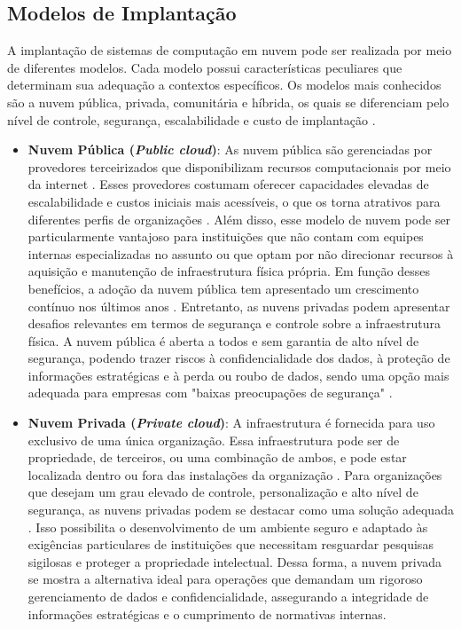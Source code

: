 \subsection{Modelos de Implantação}

A implantação de sistemas de computação em nuvem pode ser realizada por meio de diferentes modelos. Cada modelo possui características peculiares que determinam sua adequação a contextos específicos. Os modelos mais conhecidos são a nuvem pública, privada, comunitária e híbrida, os quais se diferenciam pelo nível de controle, segurança, escalabilidade e custo de implantação \cite{mell2011}.

\begin{itemize}
\item \textbf{Nuvem Pública (\textit{Public cloud})}: As nuvem pública são gerenciadas por provedores terceirizados que disponibilizam recursos computacionais por meio da internet \cite{carroll2011}. Esses provedores costumam oferecer capacidades elevadas de escalabilidade e custos iniciais mais acessíveis, o que os torna atrativos para diferentes perfis de organizações \cite{amajuoyi2024}. Além disso, esse modelo de nuvem pode ser particularmente vantajoso para instituições que não contam com equipes internas especializadas no assunto ou que optam por não direcionar recursos à aquisição e manutenção de infraestrutura física própria. Em função desses benefícios, a adoção da nuvem pública tem apresentado um crescimento contínuo nos últimos anos \cite{amajuoyi2024}. Entretanto, as nuvens privadas podem apresentar desafios relevantes em termos de segurança e controle sobre a infraestrutura física. A nuvem pública é aberta a todos e sem garantia de alto nível de segurança, podendo trazer riscos à confidencialidade dos dados, à proteção de informações estratégicas e à perda ou roubo de dados, sendo uma opção mais adequada para empresas com "baixas preocupações de segurança" \cite{sathya2023}.

\item \textbf{Nuvem Privada (\textit{Private cloud})}: A infraestrutura é fornecida para uso exclusivo de uma única organização. Essa infraestrutura pode ser de propriedade, de terceiros, ou uma combinação de ambos, e pode estar localizada dentro ou fora das instalações da organização \cite{mell2011}. Para organizações que desejam um grau elevado de controle, personalização e alto nível de segurança, as nuvens privadas podem se destacar como uma solução adequada \cite{swapna2023}. Isso possibilita o desenvolvimento de um ambiente seguro e adaptado às exigências particulares de instituições que necessitam resguardar pesquisas sigilosas e proteger a propriedade intelectual. Dessa forma, a nuvem privada se mostra a alternativa ideal para operações que demandam um rigoroso gerenciamento de dados e confidencialidade, assegurando a integridade de informações estratégicas e o cumprimento de normativas internas.


\end{itemize}
